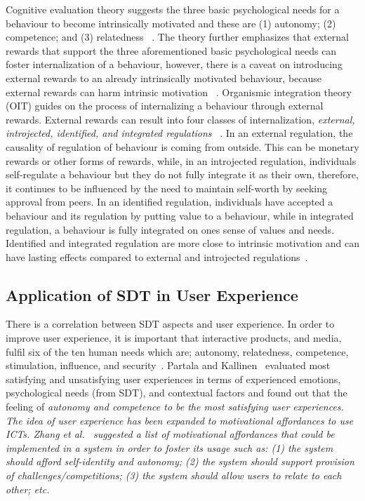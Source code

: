 \documentclass{sig-alternate}
\begin{document}
Cognitive evaluation theory suggests the three basic psychological needs for a behaviour to become intrinsically motivated and these are (1) autonomy; (2) competence; and (3) relatedness ~\cite{deci1985:intrinsic}. 
The theory further emphasizes that external rewards that support the three aforementioned basic psychological needs can foster internalization of a behaviour, however, there is a caveat on introducing external rewards to an already intrinsically motivated behaviour, because external rewards can harm intrinsic motivation ~\cite{ryan2000:self}. Organismic integration theory (OIT) guides on the process of internalizing a behaviour through external rewards. External rewards can result into four classes of internalization, \emph{external, introjected, identified, and integrated regulations} ~\cite{ryan2000:self}. In an external regulation, the causality of  regulation of behaviour is coming from outside. This can be monetary rewards or other forms of rewards, while, in an introjected regulation, individuals self-regulate a behaviour but they do not fully integrate it as their own, therefore, it continues to be influenced by the need to maintain self-worth by seeking approval from peers. In an identified  regulation, individuals have accepted a behaviour and its regulation by putting value to a behaviour, while in integrated regulation,  a behaviour is fully integrated on ones sense of values and needs. Identified and integrated regulation are more close to intrinsic motivation and can have lasting effects compared to external and introjected regulations~\cite{ryan2000intrinsic}. 

\subsection{Application of SDT in User Experience}
There is a correlation between SDT aspects and user experience. In order to improve user experience, it is important that interactive products, and media, fulfil six of the ten human needs which are; autonomy, relatedness, competence, stimulation, influence, and security~\cite{wiklund2009:needs}. Partala and Kallinen~\cite{partala2012:understanding} evaluated most satisfying and unsatisfying user experiences in terms of experienced emotions, psychological needs (from SDT), and contextual factors and found out that the feeling of \em{autonomy} and \em{competence} to be the most satisfying user experiences.
The idea of user experience has been expanded to motivational affordances to use ICTs. Zhang et al.~\cite{zhang2008:motivational} suggested a list of motivational affordances that could be implemented in a system in order to foster its usage such as: (1) the system should afford self-identity and autonomy; (2) the system should support provision of challenges/competitions; (3) the system should allow users to relate to each other; etc.
\end{document}
